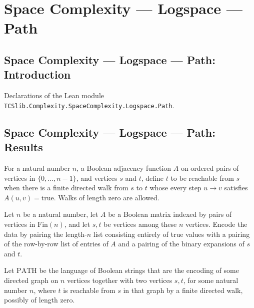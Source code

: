 \section{Space Complexity --- Logspace --- Path}
\subsection*{Space Complexity --- Logspace --- Path: Introduction}

Declarations of the Lean module \texttt{TCSlib.Complexity.SpaceComplexity.Logspace.Path}.

\subsection*{Space Complexity --- Logspace --- Path: Results}

\begin{definition}
\label{Complexity.GraphReach}
\leanok
For a natural number $n$, a Boolean adjacency function $A$ on ordered pairs of vertices
in $\{0,\ldots,n-1\}$, and vertices $s$ and $t$, define $t$ to be reachable from $s$
when there is a finite directed walk from $s$ to $t$ whose every step $u\to v$
satisfies $A(u,v)=\mathrm{true}$. Walks of length zero are allowed.
\end{definition}

\begin{definition}
\label{Complexity.encodePATH}
\leanok
{}
Let $n$ be a natural number, let $A$ be a Boolean matrix indexed by pairs of vertices in
$\mathrm{Fin}(n)$, and let $s,t$ be vertices among these $n$ vertices. Encode the data by
pairing the length-$n$ list consisting entirely of true values with a pairing of the
row-by-row list of entries of $A$ and a pairing of the binary expansions of $s$ and $t$.
\end{definition}

\begin{definition}
\label{Complexity.PATH}
\leanok
{}
Let $\mathrm{PATH}$ be the language of Boolean strings that are the encoding of some
directed graph on $n$ vertices together with two vertices $s,t$, for some natural number
$n$, where $t$ is reachable from $s$ in that graph by a finite directed walk, possibly
of length zero.
\end{definition}

